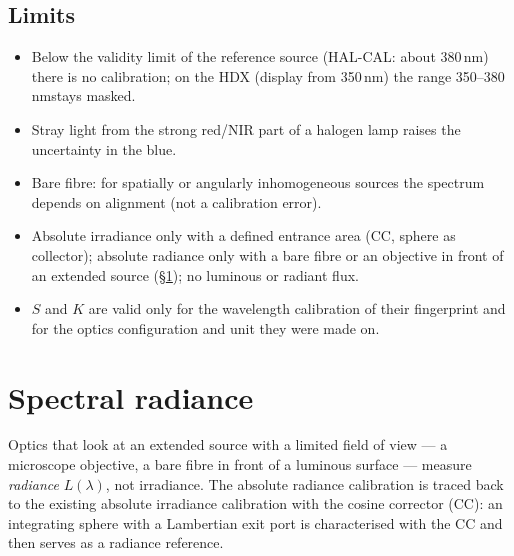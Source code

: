 \documentclass[12pt,a4paper]{article}
\newcommand{\nm}{\,nm}
\begin{document}
\subsection{Limits}
\begin{itemize}
  \item Below the validity limit of the reference source (HAL-CAL: about 380\nm)
        there is no calibration; on the HDX (display from 350\nm) the range
        350--380\nm stays masked.
  \item Stray light from the strong red/NIR part of a halogen lamp raises the
        uncertainty in the blue.
  \item Bare fibre: for spatially or angularly inhomogeneous sources the spectrum
        depends on alignment (not a calibration error).
  \item Absolute irradiance only with a defined entrance area (CC, sphere as
        collector); absolute radiance only with a bare fibre or an objective in
        front of an extended source (\S\ref{sec:radiance}); no luminous or radiant
        flux.
  \item $S$ and $K$ are valid only for the wavelength calibration of their
        fingerprint and for the optics configuration and unit they were made on.
\end{itemize}

\section{Spectral radiance}\label{sec:radiance}
Optics that look at an extended source with a limited field of view --- a
microscope objective, a bare fibre in front of a luminous surface --- measure
\emph{radiance} $L(\lambda)$, not irradiance. The absolute radiance calibration
is traced back to the existing absolute irradiance calibration with the cosine
corrector (CC): an integrating sphere with a Lambertian exit port is
characterised with the CC and then serves as a radiance reference.
\end{document}
